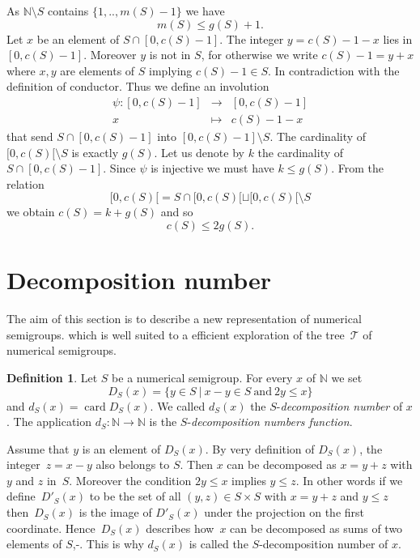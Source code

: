 \documentclass[reqno,11pt]{amsart}
\theoremstyle{plain}
\theoremstyle{definition}
\newtheorem{defi}[prop]{Definition}
\renewcommand{\leq}{\leqslant}
\newcommand{\NN}{\mathbb{N}}
\DeclareMathOperator{\card}{card}
\begin{document}
As $\NN\setminus{S}$ contains $\{1,..,m(S)-1\}$ we have 
\begin{equation}
\label{E:m}
m(S)\leq g(S)+1.
\end{equation}
Let $x$ be an element of $S\cap[0,c(S)-1]$. 
The integer $y=c(S)-1-x$ lies in $[0,c(S)-1]$. 
Moreover $y$ is not in $S$, for otherwise  we write $c(S)-1=y+x$ where $x,y$ are elements of $S$ implying $c(S)-1\in S$. 
In contradiction with the definition of conductor. 
Thus we define an involution 
\[
\begin{array}{rcl}
\psi:[0,c(S)-1]&\to&[0,c(S)-1]\\
x&\mapsto&c(S)-1-x
\end{array}
\]
that send $S\cap[0,c(S)-1]$ into $[0,c(S)-1]\setminus S$.
The cardinality of $[0,c(S)[\setminus S$ is exactly $g(S)$. Let us denote by $k$ the cardinality  of $S\cap[0,c(S)-1]$. 
Since $\psi$ is injective we must have $k\leq g(S)$. 
From the relation 
\[
[0,c(S)[=S\cap[0,c(S)[\sqcup[0,c(S)[\setminus S
\]
 we obtain $c(S)=k+g(S)$ and so 
\begin{equation}
\label{E:c}
c(S)\leq 2 g(S).
\end{equation}

\section{Decomposition number}
\label{S:DecNumber}

The aim of this section is to describe a new representation of numerical semigroups.
which is well suited to a efficient exploration of the tree~$\mathcal{T}$ of numerical semigroups. 

\begin{defi}
Let $S$ be a numerical semigroup.
For every $x$ of $\NN$  we set
\[
D_S(x)=\{y \in S\ |\ x-y\in S\ \text{and}\ 2y\leq x\}
\]
and $d_S(x)=\card D_S(x)$.
We called $d_S(x)$ the $S$-\emph{decomposition number} of $x$.
The application $d_S:\NN\to\NN$ is the $S$-\emph{decomposition numbers function}.
\end{defi}

Assume that $y$ is an element of $D_S(x)$.
By very definition of $D_S(x)$, the integer~$z=x-y$ also belongs to $S$. 
Then $x$ can be decomposed as $x=y+z$ with $y$ and $z$ in~$S$. 
Moreover the condition $2y\leq x$ implies $y\leq z$. 
In other words if we define~$D'_S(x)$ to be the set of all $(y,z)\in S\times S$ with $x=y+z$ and $y\leq z$ then~$D_S(x)$ is the image of $D'_S(x)$ under the projection on the first coordinate.
 Hence~$D_S(x)$ describes how~$x$ can be decomposed as sums of two elements of $S$,-.
 This is why $d_S(x)$ is called the $S$-decomposition number of $x$.
\end{document}
